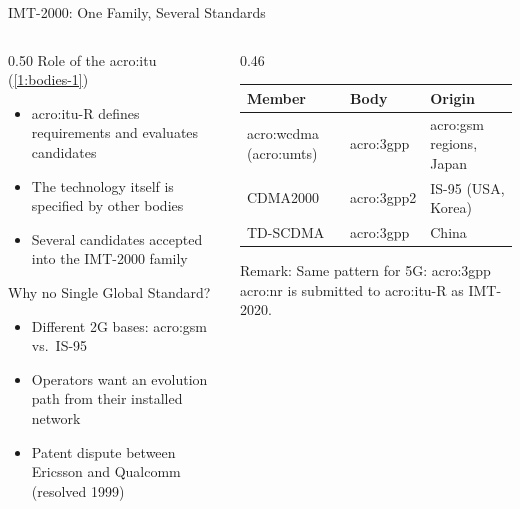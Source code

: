 \begin{frame}{IMT-2000: One Family, Several Standards}
  \begin{columns}[T,onlytextwidth]
    \begin{column}{0.50\textwidth}
      Role of the \gls{acro:itu} (\cref{1:bodies-1})
      \begin{itemize}
        \item \Gls{acro:itu}-R defines requirements and evaluates candidates
        \item The technology itself is specified by other bodies
        \item Several candidates accepted into the IMT-2000 family
      \end{itemize}
      \vspace{0.4em}
      Why no Single Global Standard?
      \begin{itemize}
        \item Different 2G bases: \gls{acro:gsm} vs.\ IS-95
        \item Operators want an evolution path from their installed network
        \item Patent dispute between Ericsson and Qualcomm (resolved 1999)~\cite{qualcomm-ericsson-1999}
      \end{itemize}
    \end{column}
    \begin{column}{0.46\textwidth}
      \centering
      \footnotesize
      \begin{tabular}{lll}
        \toprule
        \textbf{Member} & \textbf{Body} & \textbf{Origin} \\
        \midrule
        \acrshort{acro:wcdma} (\acrshort{acro:umts}) & \acrshort{acro:3gpp} & \acrshort{acro:gsm} regions, Japan \\
        CDMA2000 & \acrshort{acro:3gpp2} & IS-95 (USA, Korea) \\
        TD-SCDMA & \acrshort{acro:3gpp} & China \\
        \bottomrule
      \end{tabular}

      \normalsize
      \raggedright
      \vspace{0.5em}
      \alert{Remark:} Same pattern for 5G: \acrshort{acro:3gpp} \acrshort{acro:nr} is submitted to \acrshort{acro:itu}-R as IMT-2020.
    \end{column}
  \end{columns}
\end{frame}


